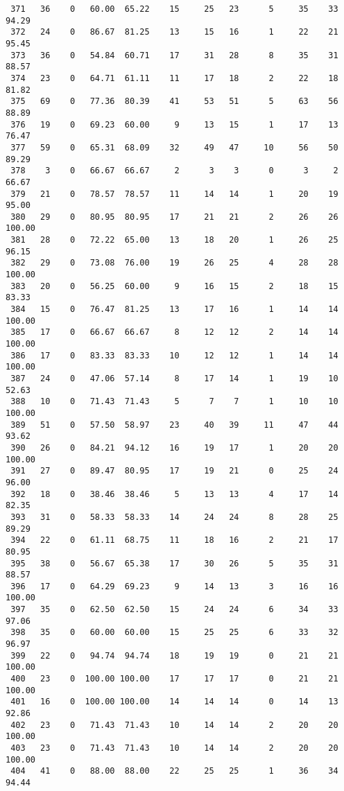 \begin{verbatim}
 371   36    0   60.00  65.22    15     25   23      5     35    33    94.29
 372   24    0   86.67  81.25    13     15   16      1     22    21    95.45
 373   36    0   54.84  60.71    17     31   28      8     35    31    88.57
 374   23    0   64.71  61.11    11     17   18      2     22    18    81.82
 375   69    0   77.36  80.39    41     53   51      5     63    56    88.89
 376   19    0   69.23  60.00     9     13   15      1     17    13    76.47
 377   59    0   65.31  68.09    32     49   47     10     56    50    89.29
 378    3    0   66.67  66.67     2      3    3      0      3     2    66.67
 379   21    0   78.57  78.57    11     14   14      1     20    19    95.00
 380   29    0   80.95  80.95    17     21   21      2     26    26   100.00
 381   28    0   72.22  65.00    13     18   20      1     26    25    96.15
 382   29    0   73.08  76.00    19     26   25      4     28    28   100.00
 383   20    0   56.25  60.00     9     16   15      2     18    15    83.33
 384   15    0   76.47  81.25    13     17   16      1     14    14   100.00
 385   17    0   66.67  66.67     8     12   12      2     14    14   100.00
 386   17    0   83.33  83.33    10     12   12      1     14    14   100.00
 387   24    0   47.06  57.14     8     17   14      1     19    10    52.63
 388   10    0   71.43  71.43     5      7    7      1     10    10   100.00
 389   51    0   57.50  58.97    23     40   39     11     47    44    93.62
 390   26    0   84.21  94.12    16     19   17      1     20    20   100.00
 391   27    0   89.47  80.95    17     19   21      0     25    24    96.00
 392   18    0   38.46  38.46     5     13   13      4     17    14    82.35
 393   31    0   58.33  58.33    14     24   24      8     28    25    89.29
 394   22    0   61.11  68.75    11     18   16      2     21    17    80.95
 395   38    0   56.67  65.38    17     30   26      5     35    31    88.57
 396   17    0   64.29  69.23     9     14   13      3     16    16   100.00
 397   35    0   62.50  62.50    15     24   24      6     34    33    97.06
 398   35    0   60.00  60.00    15     25   25      6     33    32    96.97
 399   22    0   94.74  94.74    18     19   19      0     21    21   100.00
 400   23    0  100.00 100.00    17     17   17      0     21    21   100.00
 401   16    0  100.00 100.00    14     14   14      0     14    13    92.86
 402   23    0   71.43  71.43    10     14   14      2     20    20   100.00
 403   23    0   71.43  71.43    10     14   14      2     20    20   100.00
 404   41    0   88.00  88.00    22     25   25      1     36    34    94.44

\end{verbatim}
